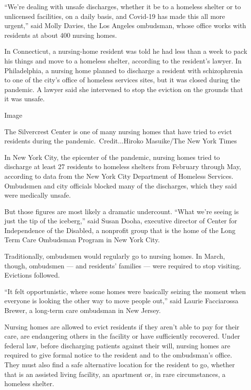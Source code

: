 ``We're dealing with unsafe discharges, whether it be to a homeless
shelter or to unlicensed facilities, on a daily basis, and Covid-19 has
made this all more urgent,'' said Molly Davies, the Los Angeles
ombudsman, whose office works with residents at about 400 nursing homes.

In Connecticut, a nursing-home resident was told he had less than a week
to pack his things and move to a homeless shelter, according to the
resident's lawyer. In Philadelphia, a nursing home planned to discharge
a resident with schizophrenia to one of the city's office of homeless
services sites, but it was closed during the pandemic. A lawyer said she
intervened to stop the eviction on the grounds that it was unsafe.

Image

The Silvercrest Center is one of many nursing homes that have tried to
evict residents during the pandemic.~Credit...Hiroko Masuike/The New
York Times

In New York City, the epicenter of the pandemic, nursing homes tried to
discharge at least 27 residents to homeless shelters from February
through May, according to data from the New York City Department of
Homeless Services. Ombudsmen and city officials blocked many of the
discharges, which they said were medically unsafe.

But those figures are most likely a dramatic undercount. ``What we're
seeing is just the tip of the iceberg,'' said Susan Dooha, executive
director of Center for Independence of the Disabled, a nonprofit group
that is the home of the Long Term Care Ombudsman Program in New York
City.

Traditionally, ombudsmen would regularly go to nursing homes. In March,
though, ombudsmen --- and residents' families --- were required to stop
visiting. Evictions followed.

``It felt opportunistic, where some homes were basically seizing the
moment when everyone is looking the other way to move people out,'' said
Laurie Facciarossa Brewer, a long-term care ombudsman in New Jersey.

Nursing homes are allowed to evict residents if they aren't able to pay
for their care, are endangering others in the facility or have
sufficiently recovered. Under federal law, before discharging patients
against their will, nursing homes are required to give formal notice to
the resident and to the ombudsman's office. They must also find a safe
alternative location for the resident to go, whether that is an assisted
living facility, an apartment or, in rare circumstances, a homeless
shelter.

